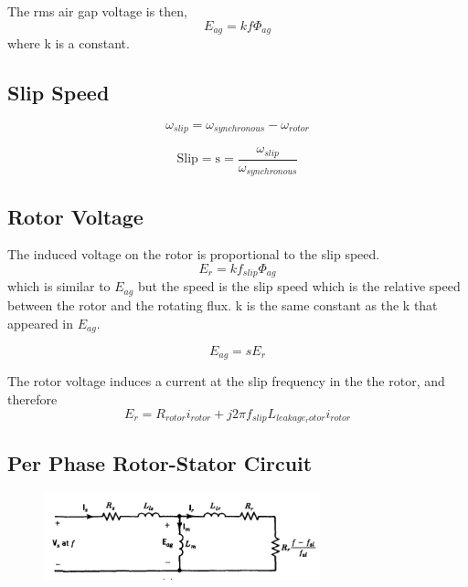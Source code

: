 \documentclass{article}
\begin{document}
    The rms air gap voltage is then,
    \begin{equation*}
        E_{ag} = k f \Phi_{ag}
    \end{equation*}
    where k is a constant.

    \subsection*{Slip Speed}
    \begin{equation*}
        \omega_{slip} = \omega_{synchronous} - \omega_{rotor}
    \end{equation*}
    
    \begin{equation*}
        \text{Slip} = \text{s} = \frac{\omega_{slip}}{\omega_{synchronous}}
    \end{equation*}

    \subsection*{Rotor Voltage}
    The induced voltage on the rotor is proportional to the slip speed.
    \begin{equation*}
        E_{r} = k f_{slip} \Phi_{ag}
    \end{equation*}
    which is similar to $E_{ag}$ but the speed is the slip speed which is the relative speed between the 
    rotor and the rotating flux. k is the same constant as the k that appeared in $E_{ag}$.

    \begin{equation*}
        E_{ag} = sE_{r}
    \end{equation*}
    
    The rotor voltage induces a current at the slip frequency in the the rotor, and therefore
    \begin{equation*}
        E_{r} = R_{rotor}i_{rotor} + j 2 \pi f_{slip} L_{leakage_rotor} i_{rotor}
    \end{equation*}

    \subsection*{Per Phase Rotor-Stator Circuit}
        \begin{figure}[H]
            \centering
            \includegraphics[width=8cm]{figures/rotor_stator_circuit.png}
        \end{figure}
\end{document}
